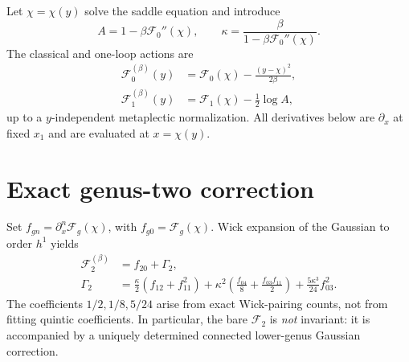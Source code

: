\documentclass[11pt,letterpaper]{article}
\begin{document}
Let $\chi=\chi(y)$ solve the saddle equation and introduce
\begin{equation}
A=1-\beta\mathcal F_0''(\chi),\qquad
\boxed{\kappa=\frac{\beta}{1-\beta\mathcal F_0''(\chi)}}.
\end{equation}
The classical and one-loop actions are
\begin{align}
\mathcal F_0^{(\beta)}(y)&=\mathcal F_0(\chi)-\frac{(y-\chi)^2}{2\beta},\\
\mathcal F_1^{(\beta)}(y)&=\mathcal F_1(\chi)-\frac12\log A,
\end{align}
up to a $y$-independent metaplectic normalization. All derivatives below are $\partial_x$ at fixed $x_1$ and are evaluated at $x=\chi(y)$.

\section{Exact genus-two correction}
Set $f_{gn}=\partial_x^n\mathcal F_g(\chi)$, with $f_{g0}=\mathcal F_g(\chi)$. Wick expansion of the Gaussian to order $h^1$ yields
\begin{equation}\boxed{\begin{aligned}
\mathcal F_2^{(\beta)}&=f_{20}+\Gamma_2,\\
\Gamma_2&=\frac{\kappa}{2}(f_{12}+f_{11}^2)
+\kappa^2\left(\frac{f_{04}}8+\frac{f_{03}f_{11}}2\right)
+\frac{5\kappa^3}{24}f_{03}^2.
\end{aligned}}\label{eq:g2}\end{equation}
The coefficients $1/2,1/8,5/24$ arise from exact Wick-pairing counts, not from fitting quintic coefficients. In particular, the bare $\mathcal F_2$ is \emph{not} invariant: it is accompanied by a uniquely determined connected lower-genus Gaussian correction.
\end{document}

